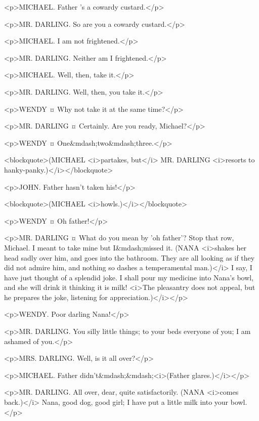 <p>MICHAEL. Father 's a cowardy custard.</p>

<p>MR. DARLING. So are you a cowardy custard.</p>


<p>MICHAEL. I am not frightened.</p>

<p>MR. DARLING. Neither am I frightened.</p>

<p>MICHAEL. Well, then, take it.</p>

<p>MR. DARLING. Well, then, you take it.</p>

<p>WENDY ¤
Why not take it at the same time?</p>

<p>MR. DARLING ¤
Certainly. Are you ready, Michael?</p>

<p>WENDY ¤
One&mdash;two&mdash;three.</p>

<blockquote>(MICHAEL <i>partakes, but</i> MR. DARLING <i>resorts to hanky-panky.)</i></blockquote>

<p>JOHN. Father hasn't taken his!</p>

<blockquote>(MICHAEL <i>howls.)</i></blockquote>

<p>WENDY ¤
Oh father!</p>

<p>MR. DARLING ¤
What do you mean by 'oh father'? Stop that row, Michael. I meant to take mine but I&mdash;missed it. (NANA <i>shakes her head sadly over him, and goes into the bathroom. They are all looking as if they did not admire him, and nothing so dashes a temperamental man.)</i> I say, I have just thought of a splendid joke.
I shall pour my medicine into Nana's bowl, and she will drink it thinking it is milk! <i>The pleasantry does not appeal, but he prepares the joke, listening for appreciation.)</i></p>

<p>WENDY. Poor darling Nana!</p>

<p>MR. DARLING. You silly little things; to your beds everyone of you; I am ashamed of you.</p>


<p>MRS. DARLING. Well, is it all over?</p>

<p>MICHAEL. Father didn't&mdash;&mdash;<i>(Father glares.)</i></p>

<p>MR. DARLING. All over, dear, quite satisfactorily. (NANA <i>comes back.)</i> Nana, good dog, good girl; I have put a little milk into your bowl.
</p>

